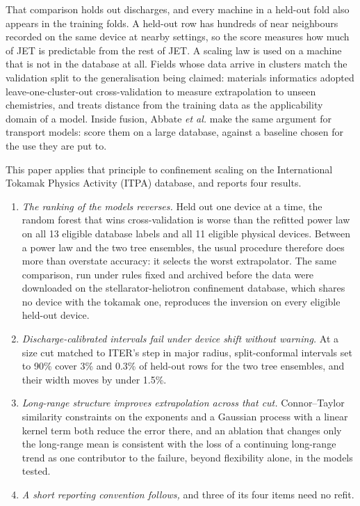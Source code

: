 \documentclass[aip,pop,preprint,amsmath,amssymb]{revtex4-2}
\begin{document}
That comparison holds out discharges, and every machine in a held-out fold also
appears in the training folds. A held-out row has hundreds of near neighbours
recorded on the same device at nearby settings, so the score measures how much
of JET is predictable from the rest of JET. A scaling law is used on a machine
that is not in the database at all. Fields whose data arrive in clusters match
the validation split to the generalisation being claimed\cite{roberts}:
materials informatics adopted leave-one-cluster-out cross-validation to measure
extrapolation to unseen chemistries\cite{meredig}, and treats distance from the
training data as the applicability domain of a model\cite{sutton}. Inside
fusion, Abbate \emph{et al.}\cite{abbate} make the same argument for transport
models: score them on a large database, against a baseline chosen for the use
they are put to.

This paper applies that principle to confinement scaling on the International
Tokamak Physics Activity (ITPA) database,
and reports four results.
\begin{enumerate}\setlength{\itemsep}{2pt}
\item \emph{The ranking of the models reverses.} Held out one device at a time,
the random forest that wins cross-validation is worse than the refitted power
law on all 13 eligible database labels and all 11 eligible physical devices.
Between a power law and the two tree ensembles, the usual procedure therefore
does more than overstate accuracy: it selects the worst extrapolator.
The same comparison, run under rules fixed and archived before the data were
downloaded on the stellarator-heliotron confinement database\cite{iss04}, which
shares no device with the tokamak one, reproduces the inversion on every
eligible held-out device.
\item \emph{Discharge-calibrated intervals fail under device shift without
warning.} At a size cut matched to
ITER's step in major radius, split-conformal intervals set to 90\% cover 3\%
and 0.3\% of held-out rows for the two tree ensembles, and their width moves
by under 1.5\%.
\item \emph{Long-range structure improves extrapolation across that cut.}
Connor--Taylor similarity constraints on the exponents and a Gaussian process
with a linear kernel term both reduce the error there, and an ablation that
changes only the long-range mean is consistent with the loss of a continuing
long-range trend as one contributor to the failure, beyond flexibility alone,
in the models tested.
\item \emph{A short reporting convention follows,} and three of its four items
need no refit.
\end{enumerate}
\end{document}
